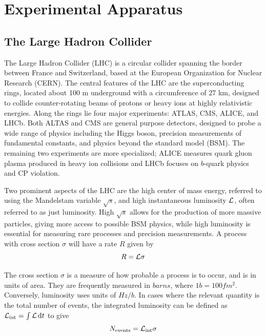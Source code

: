 
\chapter{Experimental Apparatus}
\label{chap:exp}

\section{The Large Hadron Collider} \label{sec:LHC}
The Large Hadron Collider (LHC) is a circular collider spanning the border between France and Switzerland, based at the European Organization for Nuclear Research (CERN). The central features of the LHC are the superconducting rings, located about 100 m underground with a circumference of 27 km, designed to collide counter-rotating beams of protons or heavy ions at highly relativistic energies. Along the rings lie four major experiments: ATLAS, CMS, ALICE, and LHCb. Both ALTAS and CMS are general purpose detectors, designed to probe a wide range of physics including the Higgs boson, precision measurements of fundamental constants, and physics beyond the standard model (BSM). The remaining two experiments are more specialized; ALICE measures quark gluon plasma produced in heavy ion collisions and LHCb focuses on $b$-quark physics and CP violation.

Two prominent aspects of the LHC are the high center of mass energy, referred to using the Mandelstam variable $\sqrt{s}$, and high instantaneous luminosity $\mathcal{L}$, often referred to as just luminosity. High $\sqrt{s}$ allows for the production of more massive particles, giving more access to possible BSM physics, while high luminosity is essential for measuring rare processes and precision measurements. A process with cross section $\sigma$ will have a rate $R$ given by
\begin{equation}
	R=\mathcal{L}\sigma
\end{equation}

The cross section $\sigma$ is a measure of how probable a process is to occur, and is in units of area. They are frequently measured in $\unit{barns}$, where $1\unit{b} = 100\unit{fm^2}$. Conversely, luminosity uses units of $\unit{Hz/b}$. In cases where the relevant quantity is the total number of events, the integrated luminosity can be defined as $\mathcal{L}_\mathrm{int}=\int{\mathcal{L}\dd{t}}$ to give
\begin{equation}
	N_\mathrm{events} = \mathcal{L}_\mathrm{int}\sigma
\end{equation}


